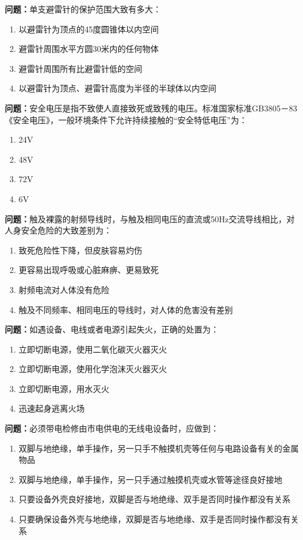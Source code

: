 \documentclass{ctexbook}
\begin{document}
\textbf{问题：}单支避雷针的保护范围大致有多大：
\begin{enumerate}[label=\Alph*), leftmargin=3em]
\item 以避雷针为顶点的45度圆锥体以内空间
\item 避雷针周围水平方圆30米内的任何物体
\item 避雷针周围所有比避雷针低的空间
\item 以避雷针为顶点、避雷针高度为半径的半球体以内空间
\end{enumerate}

\textbf{问题：}安全电压是指不致使人直接致死或致残的电压。标准国家标准GB3805－83《安全电压》，一般环境条件下允许持续接触的“安全特低电压”为：
\begin{enumerate}[label=\Alph*), leftmargin=3em]
\item 24V
\item 48V
\item 72V
\item 6V
\end{enumerate}

\textbf{问题：}触及裸露的射频导线时，与触及相同电压的直流或50Hz交流导线相比，对人身安全危险的大致差别为：
\begin{enumerate}[label=\Alph*), leftmargin=3em]
\item 致死危险性下降，但皮肤容易灼伤
\item 更容易出现呼吸或心脏麻痹、更易致死
\item 射频电流对人体没有危险
\item 触及不同频率、相同电压的导线时，对人体的危害没有差别
\end{enumerate}

\textbf{问题：}如遇设备、电线或者电源引起失火，正确的处置为：
\begin{enumerate}[label=\Alph*), leftmargin=3em]
\item 立即切断电源，使用二氧化碳灭火器灭火
\item 立即切断电源，使用化学泡沫灭火器灭火
\item 立即切断电源，用水灭火
\item 迅速起身逃离火场
\end{enumerate}

\textbf{问题：}必须带电检修由市电供电的无线电设备时，应做到：
\begin{enumerate}[label=\Alph*), leftmargin=3em]
\item 双脚与地绝缘，单手操作，另一只手不触摸机壳等任何与电路设备有关的金属物品
\item 双脚与地绝缘，单手操作，另一只手通过触摸机壳或水管等途径良好接地
\item 只要设备外壳良好接地，双脚是否与地绝缘、双手是否同时操作都没有关系
\item 只要确保设备外壳与地绝缘，双脚是否与地绝缘、双手是否同时操作都没有关系
\end{enumerate}
\end{document}
